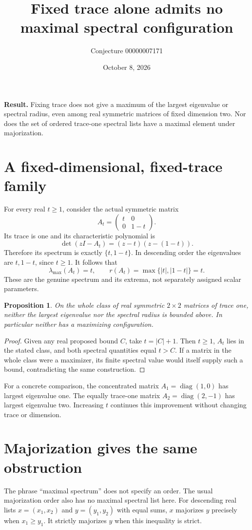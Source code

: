 \documentclass[11pt]{article}
\title{Fixed trace alone admits no maximal spectral configuration}
\author{Conjecture 00000007171}
\date{October 8, 2026}
\newtheorem{proposition}{Proposition}
\begin{document}
\maketitle
\noindent\textbf{Result.} Fixing trace does not give a maximum of the largest eigenvalue or spectral radius, even among real symmetric matrices of fixed dimension two. Nor does the set of ordered trace-one spectral lists have a maximal element under majorization.

\section*{A fixed-dimensional, fixed-trace family}
For every real $t\geq1$, consider the actual symmetric matrix
\[
 A_t=\begin{pmatrix}t&0\\0&1-t\end{pmatrix}.
\]
Its trace is one and its characteristic polynomial is
\[
 \det(zI-A_t)=(z-t)(z-(1-t)).
\]
Therefore its spectrum is exactly $\{t,1-t\}$. In descending order the eigenvalues are $t,1-t$, since $t\geq1$. It follows that
\[
 \lambda_{\max}(A_t)=t,\qquad
 r(A_t)=\max\{|t|,|1-t|\}=t.
\]
These are the genuine spectrum and its extrema, not separately assigned scalar parameters.

\begin{proposition}
On the whole class of real symmetric $2\times2$ matrices of trace one, neither the largest eigenvalue nor the spectral radius is bounded above. In particular neither has a maximizing configuration.
\end{proposition}
\begin{proof}
Given any real proposed bound $C$, take $t=|C|+1$. Then $t\geq1$, $A_t$ lies in the stated class, and both spectral quantities equal $t>C$. If a matrix in the whole class were a maximizer, its finite spectral value would itself supply such a bound, contradicting the same construction.
\end{proof}

For a concrete comparison, the concentrated matrix $A_1=\operatorname{diag}(1,0)$ has largest eigenvalue one. The equally trace-one matrix $A_2=\operatorname{diag}(2,-1)$ has largest eigenvalue two. Increasing $t$ continues this improvement without changing trace or dimension.

\newpage
\section*{Majorization gives the same obstruction}
The phrase ``maximal spectrum'' does not specify an order. The usual majorization order also has no maximal spectral list here. For descending real lists $x=(x_1,x_2)$ and $y=(y_1,y_2)$ with equal sums, $x$ majorizes $y$ precisely when $x_1\geq y_1$. It strictly majorizes $y$ when this inequality is strict.
\end{document}
